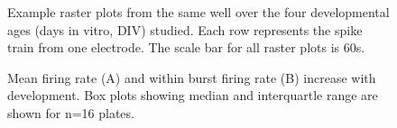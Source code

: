 \documentclass{article}
\begin{document}
\pagestyle{empty}


\makeatletter
\@fpsep\textheight
\makeatother

\begin{figure}
  \centering
  \caption{Example raster plots from the same well over the four
    developmental ages (days in vitro, DIV) studied. Each row
    represents the spike train from one electrode. The scale bar for
    all raster plots is 60s.}
\end{figure}

\begin{figure}
  \centering
  \caption{Mean firing rate (A) and within burst firing rate (B)
    increase with development.  Box plots showing median and
    interquartle range are shown for n=16 plates.}
\end{figure}
\end{document}

